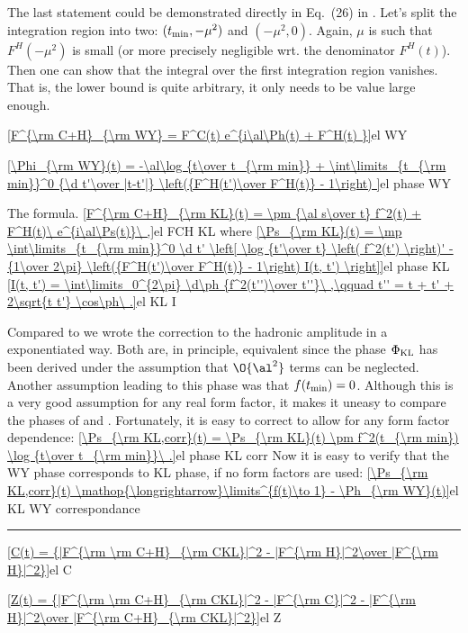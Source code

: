 The last statement could be demonstrated directly in Eq.~(26) in . Let's split the integration region into two: $(t_{\rm min}, -\mu^2)$ and $(-\mu^2, 0)$. Again, $\mu$ is such that $F^H(-\mu^2)$ is small (or more precisely negligible wrt. the denominator $F^H(t)$). Then one can show that the integral over the first integration region vanishes. That is, the lower bound is quite arbitrary, it only needs to be value large enough.

\eqref{F^{\rm C+H}_{\rm WY} = F^C(t) e^{i\al\Ph(t) + F^H(t) }}{el WY}

\eqref{\Phi_{\rm WY}(t) =  -\al\log {t\over t_{\rm min}} + \int\limits_{t_{\rm min}}^0 {\d t'\over |t-t'|} \left({F^H(t')\over F^H(t)} - 1\right) }{el phase WY}


The \KL{} formula.
\eqref{F^{\rm C+H}_{\rm KL}(t) = \pm {\al s\over t} f^2(t) + F^H(t)\ e^{i\al\Ps(t)}\ ,}{el FCH KL}
where
\eqref{\Ps_{\rm KL}(t) = \mp \int\limits_{t_{\rm min}}^0 \d t' \left[ \log {t'\over t} \left( f^2(t') \right)' - {1\over 2\pi} \left({F^H(t')\over F^H(t)} - 1\right) I(t, t') \right]}{el phase KL}
\eqref{I(t, t') = \int\limits_0^{2\pi} \d\ph {f^2(t'')\over t''}\ ,\qquad t'' = t + t' + 2\sqrt{t t'} \cos\ph\ .}{el KL I}

Compared to  we wrote the correction to the hadronic amplitude in a exponentiated way. Both are, in principle, equivalent since the phase $\Phi_{\rm KL}$ has been derived under the assumption that $\O{\al^2}$ terms can be neglected. Another assumption leading to this phase was that $f(t_{\rm min}) = 0$. Although this is a very good assumption for any real form factor, it makes it uneasy to compare the phases of \KL{} and \WY. Fortunately, it is easy to correct  to allow for any form factor dependence:
\eqref{\Ps_{\rm KL,corr}(t) = \Ps_{\rm KL}(t) \pm f^2(t_{\rm min}) \log {t\over t_{\rm min}}\ .}{el phase KL corr}
Now it is easy to verify that the WY phase corresponds to KL phase, if no form factors are used:
\eqref{\Ps_{\rm KL,corr}(t) \mathop{\longrightarrow}\limits^{f(t)\to 1} - \Ph_{\rm WY}(t)}{el KL WY correspondance}

\fi

\vskip1cm
\hrule

\eqref{C(t) = {|F^{\rm \rm C+H}_{\rm CKL}|^2 - |F^{\rm H}|^2\over |F^{\rm H}|^2}}{el C}

\eqref{Z(t) = {|F^{\rm \rm C+H}_{\rm CKL}|^2 - |F^{\rm C}|^2 - |F^{\rm H}|^2\over |F^{\rm C+H}_{\rm CKL}|^2}}{el Z}

